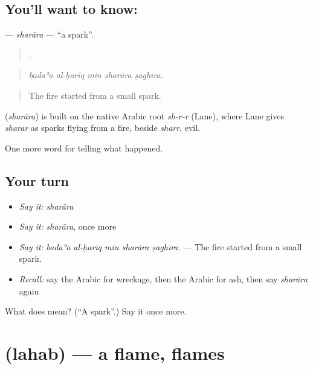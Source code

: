 \subsection*{You'll want to know: }
\textbf{} — \emph{sharāra} — \textquotedblleft{}a spark\textquotedblright{}.

\begin{quote}
    .
\end{quote}

\begin{quote}
\emph{badaʾa al-ḥarīq min sharāra ṣaghīra.}
\end{quote}

\begin{quote}
The fire started from a small spark.
\end{quote}

\begin{cousinweb}
\textbf{} (\emph{sharāra}) is built on the native Arabic root \emph{sh-r-r} (Lane), where Lane gives \emph{sharar} as sparks flying from a fire, beside \emph{sharr}, evil.
\end{cousinweb}

\begin{grammarlens}[title={What you've built}]
One more word for telling what happened.
\end{grammarlens}

\subsection*{Your turn}
\begin{itemize}
\raggedright
  \item \emph{Say it:} \emph{sharāra}
  \item \emph{Say it:} \emph{sharāra}, once more
  \item \emph{Say it:} \emph{badaʾa al-ḥarīq min sharāra ṣaghīra.} — The fire started from a small spark.
  \item \emph{Recall:} say the Arabic for wreckage, then the Arabic for ash, then say \emph{sharāra} again
\end{itemize}

\begin{tcolorbox}[breakable,colback=teal!4,colframe=teal!35!black,title={Before you move on}]
What does  mean? (\textquotedblleft{}A spark\textquotedblright{}.) Say it once more.
\end{tcolorbox}
\section[\texorpdfstring{\ar{لهب} (lahab)}{لهب (lahab)}]{ (lahab) — a flame, flames}

